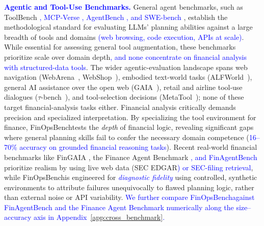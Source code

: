 \documentclass[11pt]{article}
\newcommand{\edit}[1]{\textcolor{blue}{#1}}
\newcommand{\editN}[1]{\textcolor{editgreen}{#1}}
\newcommand{\datasetname}{FinOpsBench}\xspace
\begin{document}
\noindent \textbf{\edit{Agentic and Tool-Use Benchmarks.}}
General agent benchmarks, such as ToolBench \citep{qin2024tool, qin2023toolllm}\edit{, MCP-Verse \citep{lei2025mcpverse}, AgentBench \citep{liu2023agentbench}, and SWE-bench \citep{jimenez2024swebench}}, establish the methodological
standard for evaluating LLMs'
planning abilities against a large breadth of tools and domains \edit{(web browsing, code execution, APIs at scale)}. While essential for assessing general tool augmentation, these
benchmarks prioritize scale over domain depth\edit{, and none concentrate on financial analysis with structured-data tools}. \editN{The wider agentic-evaluation landscape spans web navigation (WebArena~\citep{zhou2024webarena}, WebShop~\citep{yao2022webshop}), embodied text-world tasks (ALFWorld~\citep{shridhar2021alfworld}), general AI assistance over the open web (GAIA~\citep{mialon2024gaia}), retail and airline tool-use dialogues ($\tau$-bench~\citep{yao2024taubench}), and tool-selection decisions (MetaTool~\citep{huang2024metatool}); none of these target financial-analysis tasks either.} Financial analysis critically demands precision and specialized interpretation. By
specializing the tool environment for finance, \datasetname tests the \textit{depth} of financial logic, revealing significant gaps
where general planning skills fail to confer the necessary domain competence (\edit{16--70\% accuracy on grounded financial reasoning tasks}). Recent real-world financial benchmarks like FinGAIA \citep{zeng2025fingaiachinesebenchmarkai},
the Finance Agent Benchmark \citep{bigeard2025financeagentbenchmarkbenchmarking}\edit{, and FinAgentBench \citep{choi2025finagentbench}} prioritize realism by using live web data (SEC
EDGAR\edit{) or SEC-filing retrieval}, while \datasetname is engineered for \edit{\emph{diagnostic fidelity}} using controlled, synthetic environments to attribute failures
unequivocally to flawed planning logic, rather than external noise or API variability. \edit{We further compare \datasetname against FinAgentBench and the Finance Agent Benchmark numerically along the size--accuracy axis in Appendix~\ref{app:cross_benchmark}.}
\end{document}
